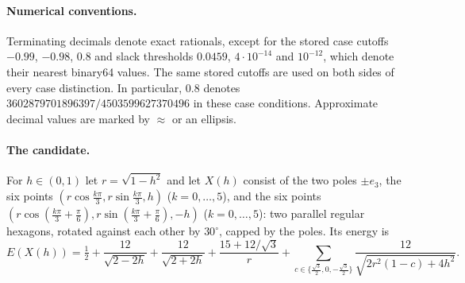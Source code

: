 \documentclass[11pt]{article}
\theoremstyle{definition}
\begin{document}
\paragraph{Numerical conventions.}
Terminating decimals denote exact rationals, except for the stored case cutoffs $-0.99$, $-0.98$, $0.8$
and slack thresholds $0.0459$, $4\cdot10^{-14}$ and $10^{-12}$, which denote their nearest binary64 values.
The same stored cutoffs are used on both sides of every case distinction. In particular,
$0.8$ denotes $3602879701896397/4503599627370496$ in these case conditions.
Approximate decimal values are marked by $\approx$ or an ellipsis.

\paragraph{The candidate.}
For $h\in(0,1)$ let $r=\sqrt{1-h^2}$ and let $X(h)$ consist of the two poles $\pm e_3$, the six points
$(r\cos\frac{k\pi}{3},r\sin\frac{k\pi}{3},h)$ ($k=0,\dots,5$), and the six points
$(r\cos(\frac{k\pi}{3}+\frac{\pi}{6}),r\sin(\frac{k\pi}{3}+\frac{\pi}{6}),-h)$ ($k=0,\dots,5$): two parallel regular hexagons,
rotated against each other by $30^\circ$, capped by the poles. Its energy is
\begin{equation}\label{eq:Efam}
 E(X(h))=\tfrac12+\frac{12}{\sqrt{2-2h}}+\frac{12}{\sqrt{2+2h}}+\frac{15+12/\sqrt3}{r}
 +\sum_{c\in\{\frac{\sqrt3}{2},0,-\frac{\sqrt3}{2}\}}\frac{12}{\sqrt{2r^2(1-c)+4h^2}} .
\end{equation}
\end{document}
